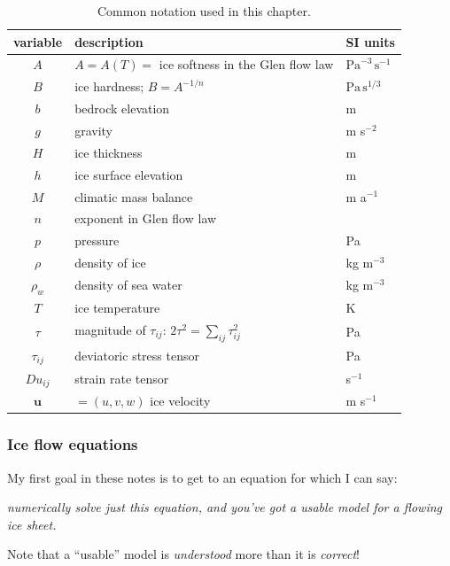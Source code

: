 \documentclass[titlepage,letterpaper,final,12pt]{scrartcl}
\begin{document}
\medskip
  \centerline{}

\begin{table}%
\caption{Common notation used in this chapter.}
\label{tab:notation}
\begin{tabular}{cll}
variable  & description & SI units \\ 
\hline
$A$ & $A=A(T)=$ ice softness in the Glen flow law & $\text{Pa}^{-3}\,\text{s}^{-1}$ \\
$B$ & ice hardness; $B=A^{-1/n}$ & $\text{Pa}\,\text{s}^{1/3}$ \\
$b$ & bedrock elevation & m \\
$g$ & gravity & m s$^{-2}$ \\
$H$ & ice thickness & m \\
$h$ & ice surface elevation & m \\
$M$ & climatic mass balance & m a$^{-1}$ \\
$n$ & exponent in Glen flow law & \\
$p$ & pressure & Pa \\
$\rho$ & density of ice & kg m$^{-3}$ \\
$\rho_w$ & density of sea water & kg m$^{-3}$ \\
$T$ & ice temperature & K \\
$\tau$ & magnitude of $\tau_{ij}$: \quad $2 \tau^2 = \sum_{ij} \tau_{ij}^2$ & Pa \\
$\tau_{ij}$ & deviatoric stress tensor & Pa \\
$Du_{ij}$ & strain rate tensor & s$^{-1}$ \\
$\mathbf{u}$ & $=(u,v,w)$ ice velocity & m s$^{-1}$ \\
\end{tabular}
\end{table}

\subsubsection*{Ice flow equations}  My first goal in these notes is to get to an equation for which I can say:
\begin{center}
\emph{numerically solve just this equation, and you've got a usable model for a flowing ice sheet.}
\end{center}
Note that a ``usable'' model is \emph{understood} more than it is \emph{correct}!
\end{document}

